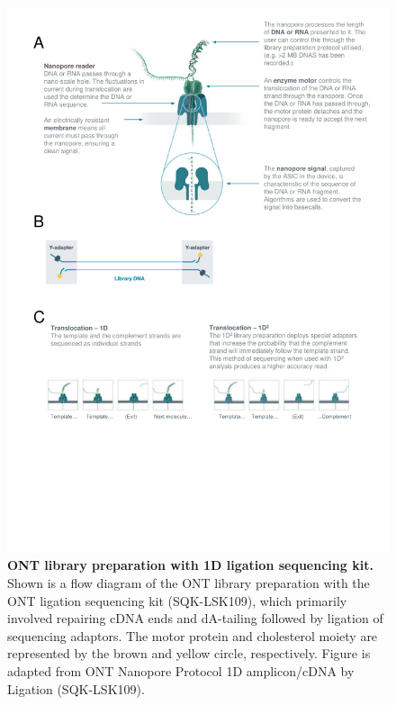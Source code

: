 \clearpage
\begin{figure}[!h]
	\centering
	\includegraphics[page=3,trim={0 16cm 0 0 },clip, scale = 0.7]{Figures/ProjectDevelopment_FiguresONT}
	\captionsetup{width=0.95\textwidth}
	\caption[ONT library preparation with 1D ligation sequencing kit]%
	{\textbf{ONT library preparation with 1D ligation sequencing kit.} Shown is a flow diagram of the ONT library preparation with the ONT ligation sequencing kit (SQK-LSK109), which primarily involved repairing cDNA ends and dA-tailing followed by ligation of sequencing adaptors. The motor protein and cholesterol moiety are represented by the brown and yellow circle, respectively. Figure is adapted from ONT Nanopore Protocol 1D amplicon/cDNA by Ligation (SQK-LSK109).}
	\label{fig:ONT_Protocol}
\end{figure}


